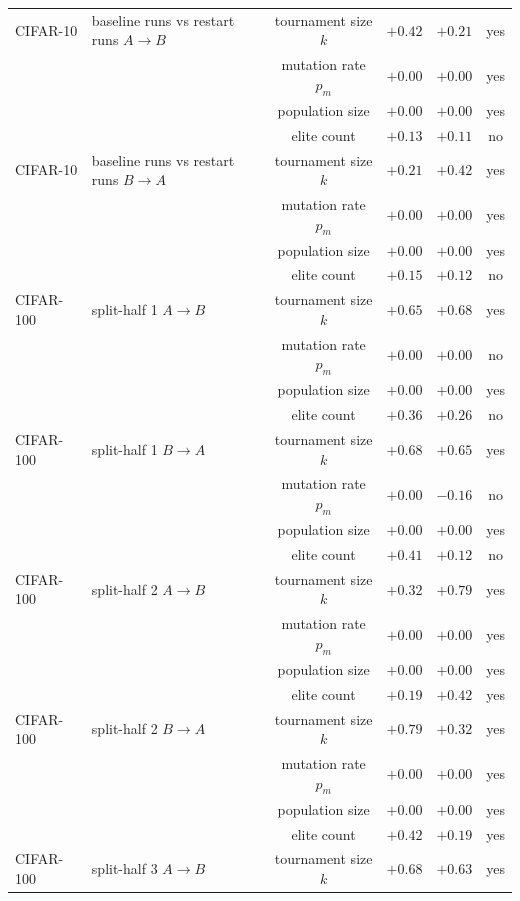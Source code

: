 \begin{tabular}{l l c rr c}
\addlinespace
CIFAR-10 & baseline runs vs restart runs $A\!\to\!B$ & tournament size $k$ & $+0.42$ & $+0.21$ & yes \\
 &  & mutation rate $p_m$ & $+0.00$ & $+0.00$ & yes \\
 &  & population size & $+0.00$ & $+0.00$ & yes \\
 &  & elite count & $+0.13$ & $+0.11$ & no \\
CIFAR-10 & baseline runs vs restart runs $B\!\to\!A$ & tournament size $k$ & $+0.21$ & $+0.42$ & yes \\
 &  & mutation rate $p_m$ & $+0.00$ & $+0.00$ & yes \\
 &  & population size & $+0.00$ & $+0.00$ & yes \\
 &  & elite count & $+0.15$ & $+0.12$ & no \\
\addlinespace
CIFAR-100 & split-half 1 $A\!\to\!B$ & tournament size $k$ & $+0.65$ & $+0.68$ & yes \\
 &  & mutation rate $p_m$ & $+0.00$ & $+0.00$ & no \\
 &  & population size & $+0.00$ & $+0.00$ & yes \\
 &  & elite count & $+0.36$ & $+0.26$ & no \\
CIFAR-100 & split-half 1 $B\!\to\!A$ & tournament size $k$ & $+0.68$ & $+0.65$ & yes \\
 &  & mutation rate $p_m$ & $+0.00$ & $-0.16$ & no \\
 &  & population size & $+0.00$ & $+0.00$ & yes \\
 &  & elite count & $+0.41$ & $+0.12$ & no \\
\addlinespace
CIFAR-100 & split-half 2 $A\!\to\!B$ & tournament size $k$ & $+0.32$ & $+0.79$ & yes \\
 &  & mutation rate $p_m$ & $+0.00$ & $+0.00$ & yes \\
 &  & population size & $+0.00$ & $+0.00$ & yes \\
 &  & elite count & $+0.19$ & $+0.42$ & yes \\
CIFAR-100 & split-half 2 $B\!\to\!A$ & tournament size $k$ & $+0.79$ & $+0.32$ & yes \\
 &  & mutation rate $p_m$ & $+0.00$ & $+0.00$ & yes \\
 &  & population size & $+0.00$ & $+0.00$ & yes \\
 &  & elite count & $+0.42$ & $+0.19$ & yes \\
\addlinespace
CIFAR-100 & split-half 3 $A\!\to\!B$ & tournament size $k$ & $+0.68$ & $+0.63$ & yes \\

\end{tabular}

